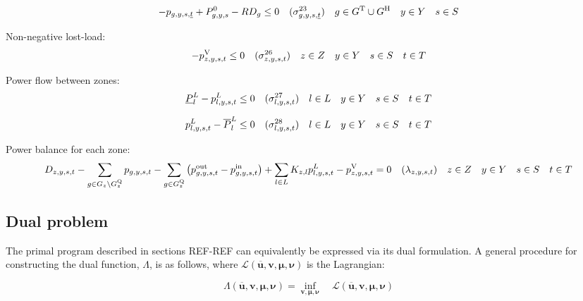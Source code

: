 \documentclass{article}
\newcommand{\sScenarioSets}{\quad  \iYear \in \sYears \quad  \iScenario \in \sScenarios \quad  \iInterval \in \sIntervals}
\begin{document}
\begin{equation}
- \vPower[\iGenerator,\iYear,\iScenario,\iIntervalStart] + \cPowerInitial - \cRampRateDown \leq 0 \quad (\dRampRateDown[\iGenerator,\iYear,\iScenario,\iIntervalStart]) \quad  \iGenerator \in \sGeneratorsThermal \cup \sGeneratorsHydro \quad  \iYear \in \sYears \quad  \iScenario \in \sScenarios
\end{equation}

Non-negative lost-load:
\begin{equation}
	- \vLostLoadPower \leq 0 \quad (\dNonNegativeLostLoad) \quad  \iZone \in \sZones \sScenarioSets
\end{equation}

Power flow between zones:
\begin{equation}
	\cPowerFlowMin - \vPowerFlow \leq 0 \quad (\dMinPowerFlow) \quad  \iLink \in \sLinks \sScenarioSets
\end{equation}

\begin{equation}
	\vPowerFlow - \cPowerFlowMax \leq 0 \quad (\dMaxPowerFlow) \quad  \iLink \in \sLinks \sScenarioSets
\end{equation}

Power balance for each zone:
\begin{equation}
\cDemand - \sum\limits_{\iGenerator \in \sGenerators_{\iZone} \setminus \sStorage_{\iZone}} \vPower - \sum\limits_{\iGenerator \in \sStorage_{\iZone}} \left(\vPowerOut - \vPowerIn\right) + \sum\limits_{\iLink \in \sLinks} \cIncidenceMatrix \vPowerFlow - \vLostLoadPower = 0 \quad (\dPowerBalance) \quad  \iZone \in \sZones \sScenarioSets
\label{eqn: power balance}
\end{equation}

\subsection{Dual problem}
The primal program described in sections REF-REF can equivalently be expressed via its dual formulation. A general procedure for constructing the dual function, $\Lambda$, is as follows, where $\mathcal{L}(\bm{\overline{u}}, \bm{v}, \bm{\mu}, \bm{\nu})$ is the Lagrangian:

\begin{equation}
\Lambda(\bm{\overline{u}}, \bm{v}, \bm{\mu}, \bm{\nu}) = \inf\limits_{\bm{v}, \bm{\mu}, \bm{\nu}} \quad \mathcal{L}(\bm{\overline{u}}, \bm{v}, \bm{\mu}, \bm{\nu})
\end{equation}
\end{document}
